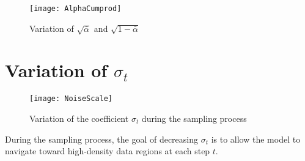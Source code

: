 \begin{figure}[H]
	\texttt{[image: AlphaCumprod]}
	\label{fig:AlphaCumprod}
	\caption{Variation of $\sqrt{\bar{\alpha}}$ and $\sqrt{1 - \bar{\alpha}}$}
\end{figure}


\section{Variation of $\sigma_t$}
\label{appendix:Appendix1:NoiseScale}
\vspace{-10pt}
\begin{figure}[H]
	\texttt{[image: NoiseScale]}
	\label{fig:NoiseScale}
	\caption{Variation of the coefficient $\sigma_t$ during the sampling process}
\end{figure}
\vspace{-10pt}
During the sampling process, the goal of decreasing $\sigma_t$ is to allow the model to navigate toward high-density data regions at each step $t$.

